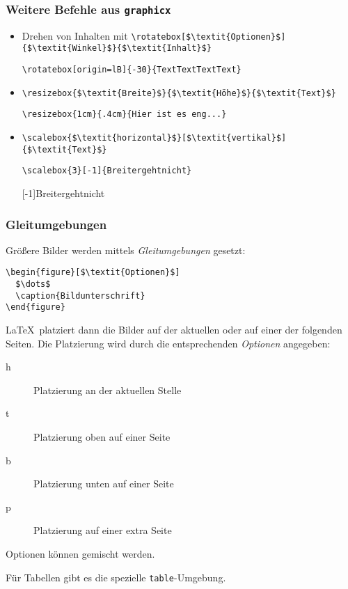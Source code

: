 \begin{frame}[fragile]
  \frametitle{Weitere Befehle aus \texttt{graphicx}}

  \onslide<+->

  \begin{itemize}[<+->]
  \item Drehen von Inhalten mit
    \lstinline!\rotatebox[$\textit{Optionen}$]{$\textit{Winkel}$}{$\textit{Inhalt}$}!
    \onslide<+->
\begin{lstlisting}
\rotatebox[origin=lB]{-30}{TextTextTextText}
\end{lstlisting}
  \item \lstinline!\resizebox{$\textit{Breite}$}{$\textit{Höhe}$}{$\textit{Text}$}!
    \onslide<+->
\begin{lstlisting}
\resizebox{1cm}{.4cm}{Hier ist es eng...}
\end{lstlisting}
  \item \lstinline!\scalebox{$\textit{horizontal}$}[$\textit{vertikal}$]{$\textit{Text}$}!
    \onslide<+->
\begin{lstlisting}
\scalebox{3}[-1]{Breitergehtnicht}
\end{lstlisting}
    \scalebox{3}[-1]{Breitergehtnicht}
  \end{itemize}
\end{frame}

\begin{frame}[fragile]
  \frametitle{Gleitumgebungen}

  \onslide<+->

  Größere Bilder werden mittels \emph{Gleitumgebungen} gesetzt:
\begin{lstlisting}
\begin{figure}[$\textit{Optionen}$]
  $\dots$
  \caption{Bildunterschrift}
\end{figure}
\end{lstlisting}
  \LaTeX\ platziert dann die Bilder auf der aktuellen oder auf einer der folgenden Seiten.
  \onslide<+-> Die Platzierung wird durch die entsprechenden \textit{Optionen} angegeben:
  \begin{description}
  \item[h] Platzierung an der aktuellen Stelle
  \item[t] Platzierung oben auf einer Seite
  \item[b] Platzierung unten auf einer Seite
  \item[p] Platzierung auf einer extra Seite
  \end{description}

  \onslide<+->

  Optionen können gemischt werden.

  \onslide<+->

  Für Tabellen gibt es die spezielle \texttt{table}-Umgebung.

\end{frame}

